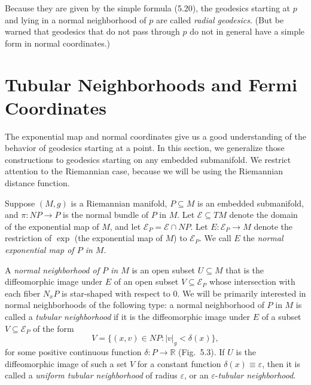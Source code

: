 Because they are given by the simple formula (5.20), the geodesics starting at $p$ and lying in a normal neighborhood of $p$ are called \emph{radial geodesics}. (But be warned that geodesics that do not pass through $p$ do not in general have a simple form in normal coordinates.)

\section{Tubular Neighborhoods and Fermi Coordinates}

The exponential map and normal coordinates give us a good understanding of the behavior of geodesics starting at a point. In this section, we generalize those constructions to geodesics starting on any embedded submanifold. We restrict attention to the Riemannian case, because we will be using the Riemannian distance function.

Suppose $(M, g)$ is a Riemannian manifold, $P \subseteq M$ is an embedded submanifold, and $\pi: NP \to P$ is the normal bundle of $P$ in $M$. Let $\mathcal{E} \subseteq TM$ denote the domain of the exponential map of $M$, and let $\mathcal{E}_P = \mathcal{E} \cap NP$. Let $E: \mathcal{E}_P \to M$ denote the restriction of $\exp$ (the exponential map of $M$) to $\mathcal{E}_P$. We call $E$ the \emph{normal exponential map of $P$ in $M$}.

A \emph{normal neighborhood of $P$ in $M$} is an open subset $U \subseteq M$ that is the diffeomorphic image under $E$ of an open subset $V \subseteq \mathcal{E}_P$ whose intersection with each fiber $N_x P$ is star-shaped with respect to $0$. We will be primarily interested in normal neighborhoods of the following type: a normal neighborhood of $P$ in $M$ is called a \emph{tubular neighborhood} if it is the diffeomorphic image under $E$ of a subset $V \subseteq \mathcal{E}_P$ of the form
\begin{equation}
V = \{(x, v) \in NP : |v|_g < \delta(x)\}, \tag{5.21}
\end{equation}
for some positive continuous function $\delta: P \to \mathbb{R}$ (Fig.\ 5.3). If $U$ is the diffeomorphic image of such a set $V$ for a constant function $\delta(x) \equiv \varepsilon$, then it is called a \emph{uniform tubular neighborhood} of radius $\varepsilon$, or an $\varepsilon$-\emph{tubular neighborhood}.

